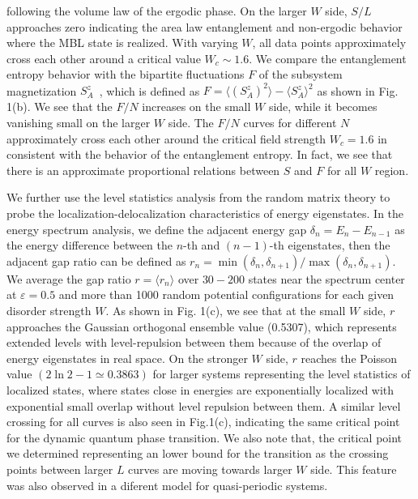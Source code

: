 \documentclass[prl,aps,epsf,showpacs,twocolumn]{revtex4}
\begin{document}
following the volume law of the ergodic phase.    On the  larger $W$ side,
$S/L$ approaches zero indicating the area law  entanglement and non-ergodic
behavior  where the MBL state is realized.  With varying $W$,  all data points
approximately cross each other around  a critical value  $W_c \sim 1.6$.  We
compare the entanglement entropy behavior with the  bipartite fluctuations $F$
of the subsystem magnetization $S^z_A$~\cite{luitz2015,song2012}, which is
defined as $F=\langle \left( S^z_A \right)^2 \rangle - \langle S^z_A \rangle^2$
as shown  in Fig. 1(b).  We see that the $F/N$ increases on the  small  $W$
side, while it becomes vanishing small on the larger $W$ side.  The $F/N$ curves
for different $N$ approximately cross each other around the critical field
strength $W_c=1.6$ in consistent with the behavior of the entanglement entropy.
In fact, we see that there is an approximate proportional relations between $S$
and $F$  for all $W$  region. 




We further use the  level statistics analysis from the random matrix
theory\cite{atas2013,oganesyan2007} to probe the localization-delocalization
characteristics of  energy  eigenstates.
In the energy spectrum analysis\cite{luitz2015}, we define the adjacent  energy
gap $\delta_n=E_n-E_{n-1}$ as the energy difference between the $n$-th and
$(n-1)$-th eigenstates, then the adjacent gap ratio can be defined as
$r_n=\min(\delta_n, \delta_{n+1})/\max(\delta_n, \delta_{n+1})$.  We  average the
gap ratio $r=\langle r_n\rangle$  over $30-200$  states near the spectrum center at
$\varepsilon=0.5$   and more than 1000 random  potential configurations for each
given disorder  strength $W$.   As shown in Fig. 1(c),   we see that at the
small $W$ side, $r$ approaches  the Gaussian  orthogonal ensemble  value
(0.5307),  which represents extended levels with level-repulsion  between them
because of the overlap of  energy eigenstates in real space.  On the stronger
$W$ side,  $r$ reaches the Poisson value $(2\ln2-1\simeq 0.3863)$ for larger
systems representing the level statistics of   localized states, where  states
close in energies are  exponentially localized with exponential small overlap
without level repulsion between them\cite{mehta1991}.  A similar level crossing
for all curves is also seen in Fig.1(c),  indicating the same critical point for
the dynamic quantum phase transition.  We also note that,   the critical point
we determined representing an lower  bound for the transition as the crossing
points between larger $L$ curves are moving towards larger $W$ side.    This
feature was also observed in a diferent model for quasi-periodic
systems\cite{vedika2016}.
\end{document}
